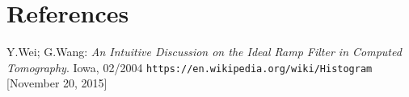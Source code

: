 \section{References}

\begin{thebibliography}{99}
 Y.Wei; G.Wang: \textit{An Intuitive Discussion on the Ideal Ramp Filter in Computed Tomography}. Iowa, 02/2004 
 \texttt{https://en.wikipedia.org/wiki/Histogram} [November 20, 2015]

\end{thebibliography}